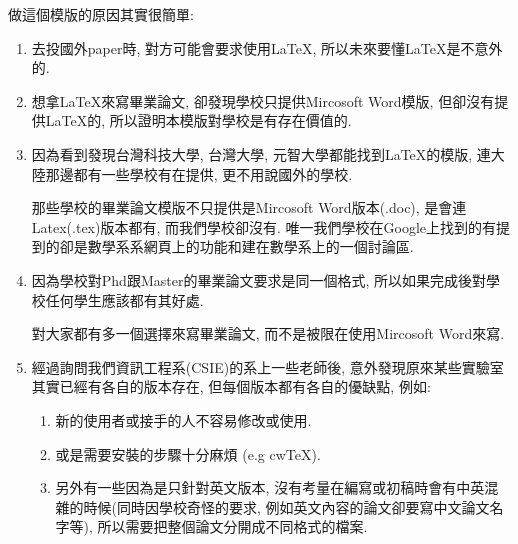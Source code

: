 

做這個模版的原因其實很簡單:

\begin{enumerate}
  \item
  {
    去投國外paper時, 對方可能會要求使用LaTeX, 所以未來要懂LaTeX是不意外的.
  } %

  \item
  {
    想拿LaTeX來寫畢業論文, 卻發現學校只提供Mircosoft Word模版, 但卻沒有提供LaTeX的, 所以證明本模版對學校是有存在價值的.
  } %

  \item
  {
    因為看到發現台灣科技大學, 台灣大學, 元智大學都能找到LaTeX的模版, 連大陸那邊都有一些學校有在提供, 更不用說國外的學校.

    那些學校的畢業論文模版不只提供是Mircosoft Word版本(.doc), 是會連Latex(.tex)版本都有, 而我們學校卻沒有. 唯一我們學校在Google上找到的有提到的卻是數學系系網頁上的功能和建在數學系上的一個討論區.
  } %

  \item
  {
    因為學校對Phd跟Master的畢業論文要求是同一個格式, 所以如果完成後對學校任何學生應該都有其好處.

    對大家都有多一個選擇來寫畢業論文, 而不是被限在使用Mircosoft Word來寫.
  } %

  \item
  {
    經過詢問我們資訊工程系(CSIE)的系上一些老師後, 意外發現原來某些實驗室其實已經有各自的版本存在, 但每個版本都有各自的優缺點, 例如:

    \begin{enumerate}

      \item
      {
        新的使用者或接手的人不容易修改或使用.
      } %

      \item
      {
        或是需要安裝的步驟十分麻煩 (e.g cwTeX).
      } %

      \item
      {
        另外有一些因為是只針對英文版本, 沒有考量在編寫或初稿時會有中英混雜的時候(同時因學校奇怪的要求, 例如英文內容的論文卻要寫中文論文名字等), 所以需要把整個論文分開成不同格式的檔案.
      } %
    \end{enumerate}
  } %
\end{enumerate}

